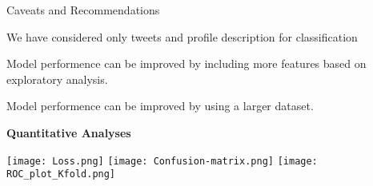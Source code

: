 \documentclass{article}
\begin{document}
\begin{adjustwidth}{-60pt}{-30pt}
\begin{singlespace}
\begin{tcolorbox}[title=\textbf{Model Card - Tweeter Gender Classification },
     breakable, sharp corners, boxrule=0.7pt]
{ \begin{mcsection}{Caveats and Recommendations}
     \item We have considered only tweets and profile description for classification
     \item Model performence can be improved by including more features based on exploratory analysis.
      \item Model performence can be improved by using a larger dataset.
 \end{mcsection}
 
 \textbf{Quantitative Analyses}
 
 \texttt{[image: Loss.png]} \texttt{[image: Confusion-matrix.png]}
 \texttt{[image: ROC\_plot\_Kfold.png]}

 
 } %
 \end{tcolorbox}
 \end{singlespace}
 \end{adjustwidth}


 
\end{document}
